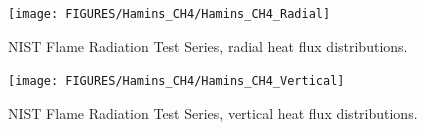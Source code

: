 \begin{figure}
\begin{center}
\texttt{[image: FIGURES/Hamins\_CH4/Hamins\_CH4\_Radial]}
\caption{NIST Flame Radiation Test Series, radial heat flux distributions.}
\label{Hamins_CH4_Radial}
\end{center}

\end{figure}
\begin{figure}
\begin{center}
\texttt{[image: FIGURES/Hamins\_CH4/Hamins\_CH4\_Vertical]}
\caption{NIST Flame Radiation Test Series, vertical heat flux distributions.}
\label{Hamins_CH4_Vertical}
\end{center}
\end{figure}


\clearpage
